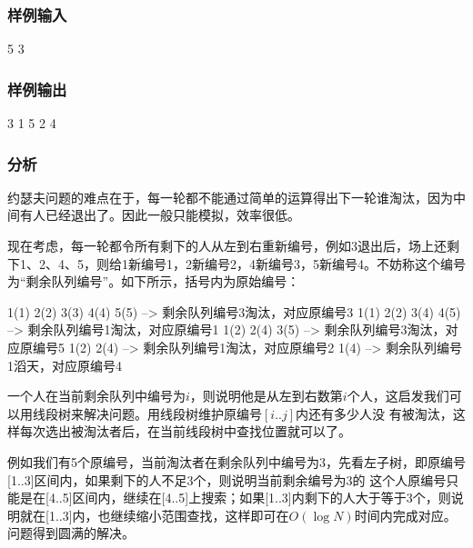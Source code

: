 \subsubsection{样例输入}
\begin{Code}
5 3
\end{Code}

\subsubsection{样例输出}
\begin{Code}
3 1 5 2 4
\end{Code}

\subsubsection{分析}
约瑟夫问题的难点在于，每一轮都不能通过简单的运算得出下一轮谁淘汰，因为中间有人已经退出了。因此一般只能模拟，效率很低。

现在考虑，每一轮都令所有剩下的人从左到右重新编号，例如3退出后，场上还剩下1、2、4、5，则给1新编号1，2新编号2，4新编号3，5新编号4。不妨称这个编号为“剩余队列编号”。如下所示，括号内为原始编号：
\begin{Code}
1(1) 2(2) 3(3) 4(4) 5(5) --> 剩余队列编号3淘汰，对应原编号3
1(1) 2(2) 3(4) 4(5) --> 剩余队列编号1淘汰，对应原编号1
1(2) 2(4) 3(5) --> 剩余队列编号3淘汰，对应原编号5
1(2) 2(4) --> 剩余队列编号1淘汰，对应原编号2
1(4) --> 剩余队列编号1滔天，对应原编号4
\end{Code}

一个人在当前剩余队列中编号为$i$，则说明他是从左到右数第$i$个人，这启发我们可以用线段树来解决问题。用线段树维护原编号$[i..j]$内还有多少人没 有被淘汰，这样每次选出被淘汰者后，在当前线段树中查找位置就可以了。

例如我们有5个原编号，当前淘汰者在剩余队列中编号为3，先看左子树，即原编号[1..3]区间内，如果剩下的人不足3个，则说明当前剩余编号为3的 这个人原编号只能是在[4..5]区间内，继续在[4..5]上搜索；如果[1..3]内剩下的人大于等于3个，则说明就在[1..3]内，也继续缩小范围查找，这样即可在$O(\log N)$时间内完成对应。问题得到圆满的解决。

